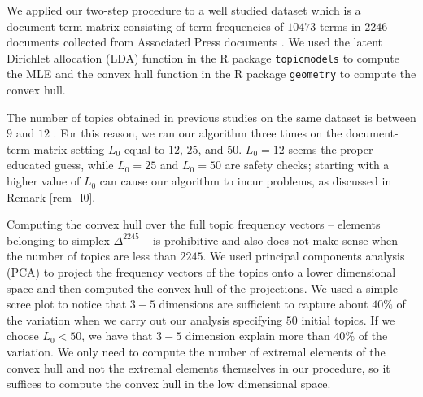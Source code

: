 \documentclass[12pt, reqno]{amsart}
\theoremstyle{definition}
\begin{document}

We applied our two-step procedure to a well studied dataset \cite{bail} which is a document-term matrix consisting of term frequencies of $10473$ terms in $2246$ documents collected from Associated Press documents \cite{harman}. We used the latent Dirichlet allocation (LDA) function in the R package  \texttt{topicmodels} \cite{topicmodels} to compute the MLE and the convex hull function in the R  package \texttt{geometry} to compute the convex hull. 

The number of topics obtained in previous studies on the same dataset is between $9$ and $12$ \cite{bail,hou}. For this reason, we ran our algorithm three times on the document-term matrix setting $L_0$ equal to $12$, $25$, and $50$. $L_0=12$ seems the proper educated guess, while $L_0=25$ and $L_0=50$ are safety checks; starting with a higher value of $L_0$ can cause our algorithm to incur problems, as discussed in Remark \ref{rem_l0}.



Computing the convex hull over the full topic frequency vectors -- elements belonging to simplex $\Delta^{2245}$ -- is prohibitive and also does not make sense when the number of topics are less than $2245$. We used principal components analysis (PCA) to project the frequency vectors of the topics onto a lower dimensional space and then computed the convex hull of the projections. We used a simple scree plot 
to notice that $3-5$ dimensions are sufficient to capture about $40\%$ of the variation when we carry out our analysis specifying $50$ initial topics. If we choose $L_0<50$, we have that $3-5$ dimension explain more than $40\%$ of the variation. We only need to compute the number of extremal elements of the convex hull and not the extremal elements themselves in our procedure, so it suffices to compute the convex hull in the low dimensional space.
\end{document}
